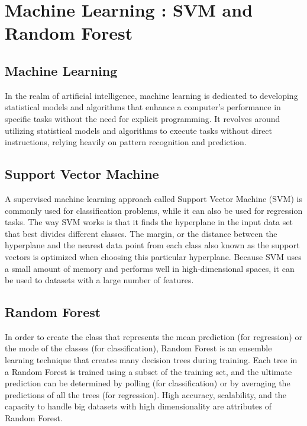 \section{Machine Learning : SVM and Random Forest }

\subsection{Machine Learning}

In the realm of artificial intelligence, machine learning is dedicated to developing statistical models and algorithms that enhance a computer's performance in specific tasks without the need for explicit programming. It revolves around utilizing statistical models and algorithms to execute tasks without direct instructions, relying heavily on pattern recognition and prediction.

\subsection{Support Vector Machine}

A supervised machine learning approach called Support Vector Machine (SVM) is commonly used for classification problems, while it can also be used for regression tasks. The way SVM works is that it finds the hyperplane in the input data set that best divides different classes. The margin, or the distance between the hyperplane and the nearest data point from each class also known as the support vectors is optimized when choosing this particular hyperplane. Because SVM uses a small amount of memory and performs well in high-dimensional spaces, it can be used to datasets with a large number of features.

\subsection{Random Forest}

In order to create the class that represents the mean prediction (for regression) or the mode of the classes (for classification), Random Forest is an ensemble learning technique that creates many decision trees during training. Each tree in a Random Forest is trained using a subset of the training set, and the ultimate prediction can be determined by polling (for classification) or by averaging the predictions of all the trees (for regression). High accuracy, scalability, and the capacity to handle big datasets with high dimensionality are attributes of Random Forest.







